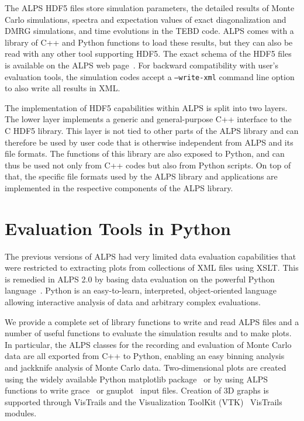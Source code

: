 \documentclass[12pt]{iopart}
\begin{document}
The ALPS HDF5 files store simulation parameters, the detailed results of Monte Carlo simulations, spectra and expectation values of exact diagonalization and DMRG simulations, and time evolutions in the TEBD code. ALPS comes with a library of C++ and Python functions to load these results, but they can also be read with any other tool supporting HDF5. The exact schema of the HDF5 files is available on the ALPS web page~\cite{alps}. For backward compatibility with user's evaluation tools, the simulation codes accept a {\tt --write-xml} command line option to also write all results in XML.

The implementation of HDF5 capabilities within ALPS is split into two layers. The lower layer implements a generic and general-purpose C++ interface to the C HDF5 library. This layer is not tied to other parts of the ALPS library and can therefore be used by user code that is otherwise independent from ALPS and its file formats. The functions of this library are also exposed to Python, and can thus be used not only from C++ codes but also from Python scripts. On top of that, the specific file formats used by the ALPS library and applications are implemented in the respective components of the ALPS library.

\section{Evaluation Tools in Python}

The previous versions of ALPS had very limited data evaluation capabilities that were restricted to extracting plots from collections of XML files using XSLT. This is remedied in ALPS 2.0 by basing data evaluation on the powerful Python language~\cite{python}. Python is an easy-to-learn, interpreted, object-oriented language allowing interactive analysis of data and arbitrary complex evaluations. 

We provide a complete set of library functions to write and read ALPS files and a number of useful functions to evaluate the simulation results and to make plots. In particular, the ALPS classes for the recording and evaluation of Monte Carlo data are all exported from C++ to Python, enabling an easy binning analysis~\cite{Ambegaokar2010} and jackknife analysis of Monte Carlo data.
Two-dimensional plots are created using the widely available Python matplotlib package~\cite{matplotlib} or by using ALPS functions to write grace~\cite{grace} or gnuplot~\cite{gnuplot} input files. Creation of 3D graphs is supported through VisTrails and the Visualization ToolKit (VTK)~\cite{vtk} VisTrails modules.
\end{document}
